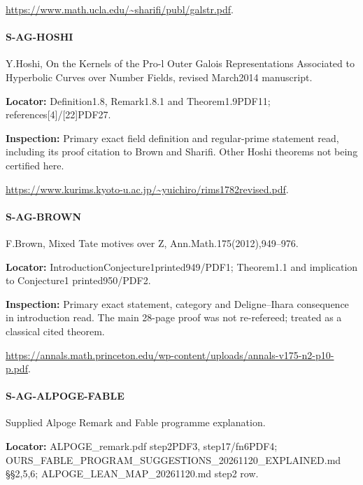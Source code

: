 \documentclass[11pt,a4paper]{article}
\begin{document}
\url{https://www.math.ucla.edu/~sharifi/publ/galstr.pdf}.

\paragraph{S-AG-HOSHI} Y.\allowbreak{}Hoshi, On the Kernels of the Pro-l Outer Galois Representations Associated to Hyperbolic Curves over Number Fields, revised March2014 manuscript.

\textbf{Locator:} Definition1.\allowbreak{}8, Remark1.\allowbreak{}8.\allowbreak{}1 and Theorem1.\allowbreak{}9PDF11; references[4]/\allowbreak{}[22]PDF27.

\textbf{Inspection:} Primary exact field definition and regular-prime statement read, including its proof citation to Brown and Sharifi.\allowbreak{} Other Hoshi theorems not being certified here.\allowbreak{}

\url{https://www.kurims.kyoto-u.ac.jp/~yuichiro/rims1782revised.pdf}.

\paragraph{S-AG-BROWN} F.\allowbreak{}Brown, Mixed Tate motives over Z, Ann.\allowbreak{}Math.\allowbreak{}175(2012),949–\allowbreak{}976.

\textbf{Locator:} IntroductionConjecture1printed949/\allowbreak{}PDF1; Theorem1.\allowbreak{}1 and implication to Conjecture1 printed950/\allowbreak{}PDF2.

\textbf{Inspection:} Primary exact statement, category and Deligne–\allowbreak{}Ihara consequence in introduction read.\allowbreak{} The main 28-page proof was not re-refereed; treated as a classical cited theorem.\allowbreak{}

\url{https://annals.math.princeton.edu/wp-content/uploads/annals-v175-n2-p10-p.pdf}.

\paragraph{S-AG-ALPOGE-FABLE} Supplied Alpoge Remark and Fable programme explanation.

\textbf{Locator:} ALPOGE\_\allowbreak{}remark.\allowbreak{}pdf step2PDF3, step17/\allowbreak{}fn6PDF4; OURS\_\allowbreak{}FABLE\_\allowbreak{}PROGRAM\_\allowbreak{}SUGGESTIONS\_\allowbreak{}20261120\_\allowbreak{}EXPLAINED.\allowbreak{}md §§2,5,6; ALPOGE\_\allowbreak{}LEAN\_\allowbreak{}MAP\_\allowbreak{}20261120.\allowbreak{}md step2 row.
\end{document}
